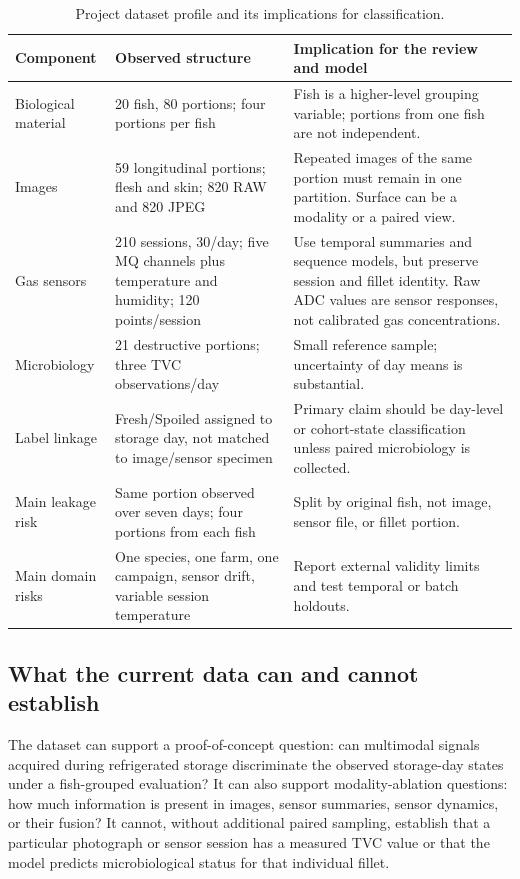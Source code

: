 \documentclass[11pt]{article}
\begin{document}
\begin{table}[H]
\centering
\caption{Project dataset profile and its implications for classification.}
\label{tab:project}
\small
\begin{tabularx}{\textwidth}{P{0.25\textwidth}P{0.25\textwidth}Y}
\toprule
\textbf{Component} & \textbf{Observed structure} & \textbf{Implication for the review and model}\\
\midrule
Biological material & 20 fish, 80 portions; four portions per fish & Fish is a higher-level grouping variable; portions from one fish are not independent.\\
Images & 59 longitudinal portions; flesh and skin; 820 RAW and 820 JPEG & Repeated images of the same portion must remain in one partition. Surface can be a modality or a paired view.\\
Gas sensors & 210 sessions, 30/day; five MQ channels plus temperature and humidity; 120 points/session & Use temporal summaries and sequence models, but preserve session and fillet identity. Raw ADC values are sensor responses, not calibrated gas concentrations.\\
Microbiology & 21 destructive portions; three TVC observations/day & Small reference sample; uncertainty of day means is substantial.\\
Label linkage & Fresh/Spoiled assigned to storage day, not matched to image/sensor specimen & Primary claim should be day-level or cohort-state classification unless paired microbiology is collected.\\
Main leakage risk & Same portion observed over seven days; four portions from each fish & Split by original fish, not image, sensor file, or fillet portion.\\
Main domain risks & One species, one farm, one campaign, sensor drift, variable session temperature & Report external validity limits and test temporal or batch holdouts.\\
\bottomrule
\end{tabularx}
\end{table}

\subsection{What the current data can and cannot establish}

The dataset can support a proof-of-concept question: can multimodal signals acquired during refrigerated storage discriminate the observed storage-day states under a fish-grouped evaluation? It can also support modality-ablation questions: how much information is present in images, sensor summaries, sensor dynamics, or their fusion? It cannot, without additional paired sampling, establish that a particular photograph or sensor session has a measured TVC value or that the model predicts microbiological status for that individual fillet.
\end{document}
